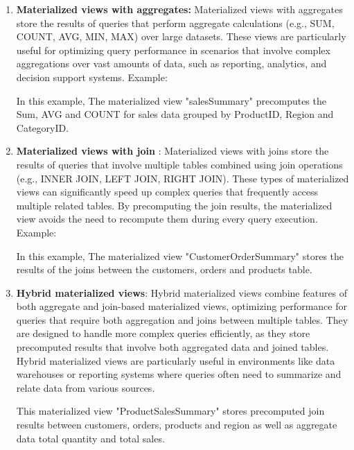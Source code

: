 \begin{enumerate}[label=\alph*)]
    \item \textbf{Materialized views with aggregates:} Materialized views with aggregates store the results of queries that perform aggregate calculations (e.g., SUM, COUNT, AVG, MIN, MAX) over large datasets. These views are particularly useful for optimizing query performance in scenarios that involve complex aggregations over vast amounts of data, such as reporting, analytics, and decision support systems. Example:\vspace{.4cm}
    
    

    In this example, The materialized view "salesSummary" precomputes the Sum, AVG and COUNT for sales data grouped by ProductID, Region and CategoryID.

    \item \textbf{Materialized views with join }: Materialized views with joins store the results of queries that involve multiple tables combined using join operations (e.g., INNER JOIN, LEFT JOIN, RIGHT JOIN). These types of materialized views can significantly speed up complex queries that frequently access multiple related tables. By precomputing the join results, the materialized view avoids the need to recompute them during every query execution. Example: \vspace{.4cm}
    
    

    In this example, The materialized view "CustomerOrderSummary"
    stores the results of the joins between the customers, orders and products table.
    \item \textbf{Hybrid materialized views}: Hybrid materialized views combine features of both aggregate and join-based materialized views, optimizing performance for queries that require both aggregation and joins between multiple tables. They are designed to handle more complex queries efficiently, as they store precomputed results that involve both aggregated data and joined tables. Hybrid materialized views are particularly useful in environments like data warehouses or reporting systems where queries often need to summarize and relate data from various sources.\vspace{.4cm}
    
     
    
This materialized view "ProductSalesSummary" stores precomputed join results between customers, orders, products and region as well as aggregate data total quantity and total sales.
    
\end{enumerate}

